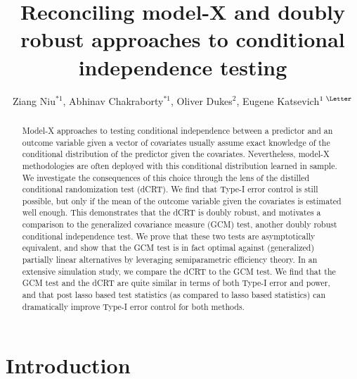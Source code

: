 \documentclass[12pt]{article}
\theoremstyle{definition}
\theoremstyle{remark}
\begin{document}
	
	
	
	
	\title{Reconciling model-X and doubly robust approaches to conditional independence testing}
	\author{Ziang Niu$^{*1}$, Abhinav Chakraborty$^{*1}$,
		Oliver Dukes$^2$, Eugene Katsevich$\textsuperscript{1 \Letter}$}
	
	
	\renewcommand{\thefootnote}{*} 
	\renewcommand{\thefootnote}{1}
	\renewcommand{\thefootnote}{2}
	\renewcommand{\thefootnote}{\Letter} 
	
	\maketitle
	\thispagestyle{empty}
	\begin{abstract}
		Model-X approaches to testing conditional independence between a predictor and an outcome variable given a vector of covariates usually assume exact knowledge of the conditional distribution of the predictor given the covariates. Nevertheless, model-X methodologies are often deployed with this conditional distribution learned in sample. We investigate the consequences of this choice through the lens of the distilled conditional randomization test (dCRT). We find that Type-I error control is still possible, but only if the mean of the outcome variable given the covariates is estimated well enough. This demonstrates that the dCRT is doubly robust, and motivates a comparison to the generalized covariance measure (GCM) test, another doubly robust conditional independence test. We prove that these two tests are asymptotically equivalent, and show that the GCM test is in fact optimal against (generalized) partially linear alternatives by leveraging semiparametric efficiency theory. In an extensive simulation study, we compare the dCRT to the GCM test. We find that the GCM test and the dCRT are quite similar in terms of both Type-I error and power, and that post lasso based test statistics (as compared to lasso based statistics) can dramatically improve Type-I error control for both methods.
	\end{abstract}
	
	
	\section{Introduction}
	
\end{document}
